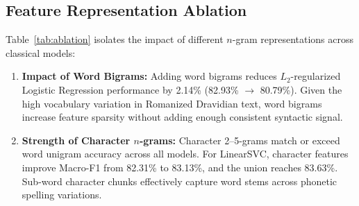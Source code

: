 \documentclass[10pt,conference]{IEEEtran}
\begin{document}
\subsection{Feature Representation Ablation}
Table~\ref{tab:ablation} isolates the impact of different $n$-gram representations across classical models:
\begin{enumerate}
    \item \textbf{Impact of Word Bigrams:} Adding word bigrams reduces $L_2$-regularized Logistic Regression performance by 2.14\% (82.93\% $\rightarrow$ 80.79\%). Given the high vocabulary variation in Romanized Dravidian text, word bigrams increase feature sparsity without adding enough consistent syntactic signal.
    \item \textbf{Strength of Character $n$-grams:} Character 2--5-grams match or exceed word unigram accuracy across all models. For LinearSVC, character features improve Macro-F1 from 82.31\% to 83.13\%, and the union reaches 83.63\%. Sub-word character chunks effectively capture word stems across phonetic spelling variations.
\end{enumerate}

\begin{table}[t]
\caption{Feature representation ablation on CMTE-NITANP Split~B (Test Macro-F1, Seed 42). Bold indicates the top feature set per model.}
\label{tab:ablation}
\centering
\footnotesize
\setlength{\tabcolsep}{4.5pt}
\end{table}
\end{document}
